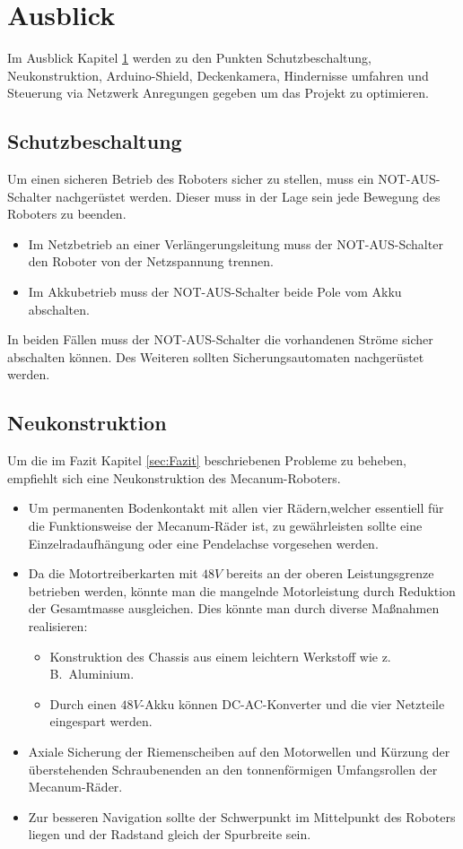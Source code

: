 
\section{Ausblick}
\label{sec:Ausblick}
Im Ausblick Kapitel \ref{sec:Ausblick} werden zu den Punkten Schutzbeschaltung, Neukonstruktion, Arduino-Shield, Deckenkamera, Hindernisse umfahren und Steuerung via Netzwerk Anregungen gegeben um das Projekt zu optimieren.

\subsection{Schutzbeschaltung}
\label{sec:Schutzbeschaltung}
Um einen sicheren Betrieb des Roboters sicher zu stellen, muss ein NOT-AUS-Schalter nachgerüstet werden. Dieser muss in der Lage sein jede Bewegung des Roboters zu beenden.
\begin{itemize}
\item{Im Netzbetrieb an einer Verlängerungsleitung muss der NOT-AUS-Schalter den Roboter von der Netzspannung trennen.}
\item{Im Akkubetrieb muss der NOT-AUS-Schalter beide Pole vom Akku abschalten.}
\end{itemize}
In beiden Fällen muss der NOT-AUS-Schalter die vorhandenen Ströme sicher abschalten können. Des Weiteren sollten Sicherungsautomaten nachgerüstet werden.

\subsection{Neukonstruktion}
\label{sec:Neukonstruktion}
Um die im Fazit Kapitel \ref{sec:Fazit} beschriebenen Probleme zu beheben, empfiehlt sich eine Neukonstruktion des Mecanum-Roboters.
\begin{itemize}
\item{Um permanenten Bodenkontakt mit allen vier Rädern,welcher essentiell für die Funktionsweise der Mecanum-Räder ist, zu gewährleisten sollte eine Einzelradaufhängung oder eine Pendelachse vorgesehen werden.}
\item{Da die Motortreiberkarten mit $48V$ bereits an der oberen Leistungsgrenze betrieben werden, könnte man die mangelnde Motorleistung durch Reduktion der Gesamtmasse ausgleichen. Dies könnte man durch diverse Maßnahmen realisieren:
\begin {itemize}
\item{Konstruktion des Chassis aus einem leichtern Werkstoff wie z.\,B.\ Aluminium.}
\item{Durch einen $48V$-Akku können DC-AC-Konverter und die vier Netzteile eingespart werden.}
\end{itemize}
}
\item{Axiale Sicherung der Riemenscheiben auf den Motorwellen und Kürzung der überstehenden Schraubenenden an den tonnenförmigen Umfangsrollen der Mecanum-Räder.}
\item{Zur besseren Navigation sollte der Schwerpunkt im Mittelpunkt des Roboters liegen und der Radstand gleich der Spurbreite sein.}
\end{itemize}

